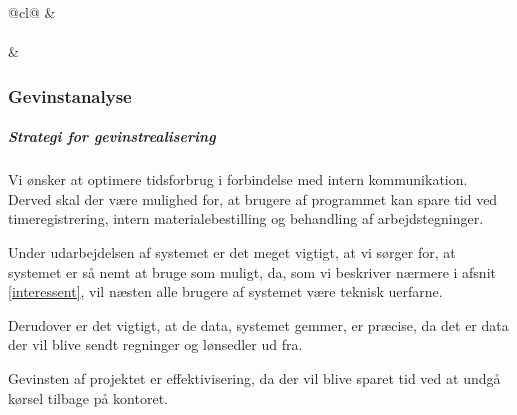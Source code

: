 \begin{table}[H]
{\begin{tabular}{@{}cl@{}}
                                                                                                &                                   \\ \midrule
{}                                                                                                                                                                               \\ \midrule
{} &  \\ \bottomrule
\end{tabular}
}
\end{table}

\subsubsection{Gevinstanalyse}
\subparagraph{Strategi for gevinstrealisering}
Vi ønsker at optimere tidsforbrug i forbindelse med intern kommunikation. Derved skal der være mulighed for, at brugere af programmet kan spare tid ved timeregistrering, intern materialebestilling og behandling af arbejdstegninger.

Under udarbejdelsen af systemet er det meget vigtigt, at vi sørger for, at systemet er så nemt at bruge som muligt, da, som vi beskriver nærmere i afsnit \ref{interessent}, vil næsten alle brugere af systemet være teknisk uerfarne.

Derudover er det vigtigt, at de data, systemet gemmer, er præcise, da det er data der vil blive sendt regninger og lønsedler ud fra.

Gevinsten af projektet er effektivisering, da der vil blive sparet tid ved at undgå kørsel tilbage på kontoret.

